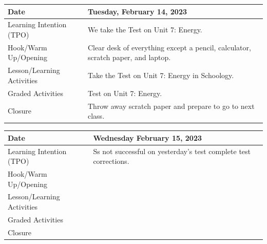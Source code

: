 \documentclass{article}
\numberwithin{equation}{section}
\numberwithin{figure}{section}
\begin{document}
\begin{tabular}{|m{}|m{}|}
    \hline  
    \cellcolor{black!20}\textbf{Date} &
    \cellcolor{black!20}\textbf{Tuesday, February 14, 2023} \\
    \hline
    Learning Intention (TPO) & We take the Test on Unit 7: Energy.\\
    \hline
    Hook/Warm Up/Opening & Clear desk of everything except a pencil, calculator, scratch paper, and laptop.\\
    \hline
    Lesson/Learning Activities & Take the Test on Unit 7: Energy in Schoology.\\
    \hline
    Graded Activities & Test on Unit 7: Energy.\\
    \hline
    Closure & Throw away scratch paper and prepare to go to next class.\\  
    \hline
\end{tabular} 

\begin{tabular}{|m{}|m{}|}
    \hline  
    \cellcolor{black!20}\textbf{Date} &
    \cellcolor{black!20}\textbf{Wednesday February 15, 2023} \\
    \hline
    Learning Intention (TPO) & Ss not successful on yesterday's test complete test corrections.\\
    \hline
    Hook/Warm Up/Opening & \\
    \hline
    Lesson/Learning Activities & \\
    \hline
    Graded Activities & \\
    \hline
    Closure & \\  
    \hline
\end{tabular} 




\end{document}
